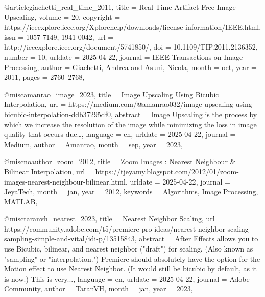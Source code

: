 @article{giachetti_real_time_2011,
	title = {Real-{Time} {Artifact}-{Free} {Image} {Upscaling}},
	volume = {20},
	copyright = {https://ieeexplore.ieee.org/Xplorehelp/downloads/license-information/IEEE.html},
	issn = {1057-7149, 1941-0042},
	url = {http://ieeexplore.ieee.org/document/5741850/},
	doi = {10.1109/TIP.2011.2136352},
	number = {10},
	urldate = {2025-04-22},
	journal = {IEEE Transactions on Image Processing},
	author = {Giachetti, Andrea and Asuni, Nicola},
	month = oct,
	year = {2011},
	pages = {2760--2768},
}

@misc{amanrao_image_2023,
	title = {Image {Upscaling} {Using} {Bicubic} {Interpolation}},
	url = {https://medium.com/@amanrao032/image-upscaling-using-bicubic-interpolation-ddb37295df0},
	abstract = {Image Upscaling is the process by which we increase the resolution of the image while minimizing the loss in image quality that occurs due…},
	language = {en},
	urldate = {2025-04-22},
	journal = {Medium},
	author = {{Amanrao}},
	month = sep,
	year = {2023},
}

@misc{noauthor_zoom_2012,
	title = {Zoom {Images} : {Nearest} {Neighbour} \& {Bilinear} {Interpolation}},
	url = {https://tjeyamy.blogspot.com/2012/01/zoom-images-nearest-neighbour-bilinear.html},
	urldate = {2025-04-22},
	journal = {JeyaTech},
	month = jan,
	year = {2012},
	keywords = {Algorithms, Image Processing, MATLAB},
}

@misc{taranvh_nearest_2023,
	title = {Nearest {Neighbor} {Scaling}},
	url = {https://community.adobe.com/t5/premiere-pro-ideas/nearest-neighbor-scaling-sampling-simple-and-vital/idi-p/13515843},
	abstract = {After Effects allows you to use Bicubic, bilinear, and nearest neighbor ("draft") for scaling. (Also known as "sampling" or "interpolation.")  Premiere should absolutely have the option for the Motion effect to use Nearest Neighbor. (It would still be bicubic by default, as it is now.)  This is very...},
	language = {en},
	urldate = {2025-04-22},
	journal = {Adobe Community},
	author = {{TaranVH}},
	month = jan,
	year = {2023},
}

